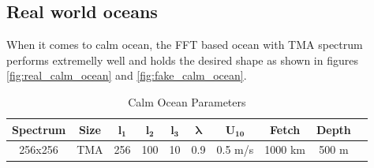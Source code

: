 \subsection{Real world oceans}
When it comes to calm ocean, the FFT based ocean with TMA spectrum performs extremelly well and holds the desired shape as shown in figures \ref{fig:real_calm_ocean} and \ref{fig:fake_calm_ocean}.
\begin{table}[h]
    \centering
    \begin{tabular}{|c|c|c|c|c|c|c|c|c|c|}
        \hline
        \textbf{Spectrum} & \textbf{Size} & $\mathbf{l_1}$ & $\mathbf{l_2}$ & $\mathbf{l_3}$ & $\mathbf{\lambda}$ & $\mathbf{U_{10}}$ & \textbf{Fetch} & \textbf{Depth} \\
        \hline
        256x256 & TMA & 256 & 100 & 10 & 0.9 & 0.5 m/s & 1000 km & 500 m \\
        \hline
    \end{tabular}
    \caption{Calm Ocean Parameters}
    \label{tab:calm_ocean}
\end{table}

